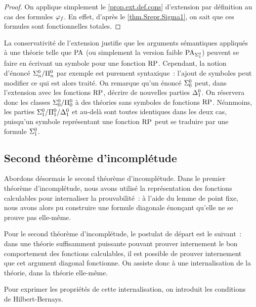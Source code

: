 \begin{proof}
  On applique simplement le \cref{prop.ext.def.cons} d'extension par définition
  au cas des formules $\varphi_f$. En effet, d'après le \cref{thm.Srepr.Sigma1},
  on sait que ces formules sont fonctionnelles totales.
\end{proof}

\begin{remark}
  La conservativité de l'extension justifie que les arguments sémantiques
  appliqués à une théorie telle que $\operatorname{PA}$ (ou simplement la version
  faible $\operatorname{PA}_{\Sigma^0_{1}}$) peuvent se faire en écrivant un symbole pour une
  fonction $\operatorname{RP}$. Cependant, la notion d'énoncé
  $\Sigma^0_{n} / \Pi^0_{n}$ par exemple est purement syntaxique~: l'ajout
  de symboles peut modifier ce qui est alors traité. On remarque qu'un
  énoncé $\Sigma^0_{0}$ peut, dans l'extension avec les fonctions $\operatorname{RP}$,
  décrire de nouvelles parties $\Delta^0_{1}$. On réservera donc les classes
  $\Sigma^0_{0} / \Pi^0_{0}$ à des théories sans symboles de fonctions
  $\operatorname{RP}$. Néanmoins, les parties
  $\Sigma^0_{1} / \Pi^0_{1} / \Delta^0_{1}$ et
  au-delà sont toutes identiques dans les deux cas, puisqu'un symbole
  représentant une fonction $\operatorname{RP}$ peut se traduire par une formule
  $\Sigma^0_{1}$.
\end{remark}

\subsection{Second théorème d'incomplétude}

Abordons désormais le second théorème d'incomplétude. Dans le premier théorème
d'incomplétude, nous avons utilisé la représentation des fonctions calculables
pour internaliser la prouvabilité~: à l'aide du lemme de point fixe, nous avons
alors pu construire une formule diagonale énonçant qu'elle ne se prouve pas
elle-même.

Pour le second théorème d'incomplétude, le postulat de départ est le suivant~:
dans une théorie suffisamment puissante pouvant prouver internement le bon
comportement des fonctions calculables, il est possible de prouver
internement que cet argument diagonal fonctionne. On assiste donc à une
internalisation de la théorie, dans la théorie elle-même.

Pour exprimer les propriétés de cette internalisation, on introduit les
conditions de Hilbert-Bernays.

